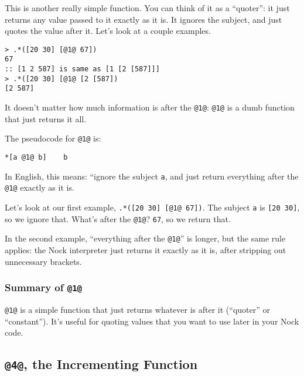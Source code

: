 \documentclass[twoside]{article}
\begin{document}
This is another really simple function. You can think of it as a “quoter”: it just returns any value passed to it exactly as it is. It ignores the subject, and just quotes the value after it. Let's look at a couple examples.

\begin{lstlisting}[style=listingblock]
> .*([20 30] [@1@ 67])
67
:: [1 2 587] is same as [1 [2 [587]]]
> .*([20 30] [@1@ [2 [587])
[2 587]
\end{lstlisting}

It doesn't matter how much information is after the \lstinline[style=inlinecode]{@1@}: \lstinline[style=inlinecode]{@1@} is a dumb function that just returns it all.

The pseudocode for \lstinline[style=inlinecode]{@1@} is:

\begin{lstlisting}[style=listingcode]
*[a @1@ b]    b
\end{lstlisting}

In English, this means: ``ignore the subject \lstinline[style=inlinecode]{a}, and just return everything after the \lstinline[style=inlinecode]{@1@} exactly as it is.

Let's look at our first example, \lstinline[style=inlinecode]{.*([20 30] [@1@ 67])}. The subject \lstinline[style=inlinecode]{a} is \lstinline[style=inlinecode]{[20 30]}, so we ignore that. What's after the \lstinline[style=inlinecode]{@1@}? \lstinline[style=inlinecode]{67}, so we return that.

In the second example, “everything after the \lstinline[style=inlinecode]{@1@}” is longer, but the same rule applies: the Nock interpreter just returns it exactly as it is, after stripping out unnecessary brackets.

\subsubsection{Summary of \lstinline[style=inlinecode]{@1@}}

\lstinline[style=inlinecode]{@1@} is a simple function that just returns whatever is after it (“quoter” or “constant”). It's useful for quoting values that you want to use later in your Nock code.

\subsection{\lstinline[style=inlinecode]{@4@}, the Incrementing Function}
\label{sxn:nock4}
\end{document}
